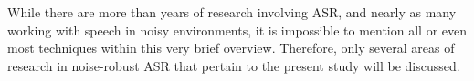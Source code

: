 % 

While there are more than \DIFdelbegin {}\DIFdelend \DIFaddbegin {}\DIFaddend years of research involving ASR, and nearly as many working with speech in noisy environments, it is impossible to mention all or even most techniques within this very brief overview.  Therefore, %
 only several areas of research in noise-robust ASR that pertain to the present study will be discussed.

